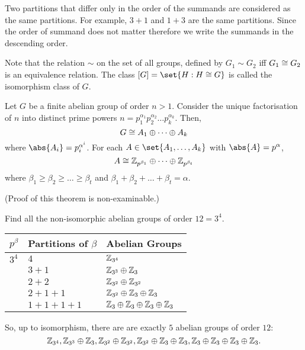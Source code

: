 \documentclass[11pt]{penrose}
\begin{document}
Two partitions that differ only in the order of the summands are considered as the same partitions. For example, $3+1$ and $1+3$ are the same partitions. Since the order of summand does not matter therefore we write the summands in the descending order.

Note that the relation $\sim$ on the set of all groups, defined by $G_{1} \sim G_{2}$ iff $G_{1} \mathrel{\cong} G_{2}$ is an equivalence relation. The class $[G] = \set{H : H \isom G}$ is called the isomorphism class of $G$.

\begin{nthm}
    Let $G$ be a finite abelian group of order $n > 1$. Consider the unique factorisation of $n$ into distinct prime powers $n = p_{1}^{\alpha_{1}} p_{2}^{\alpha_{2}} \dots p_{k}^{\alpha_{k}}$. Then,
    \begin{equation*}
        G \mathrel{\cong} A_{1} \oplus \dots \oplus A_{k}
    \end{equation*}
    where $\abs{A_{i}} = p_{i}^{\alpha^{i}}$. For each $A \in \set{A_{1}, \dots, A_{k}}$ with $\abs{A} = p^{\alpha}$,
    \begin{equation*}
        A \mathrel{\cong} \mathbb{Z}_{p^{\beta_{1}}} \oplus \dots \oplus \mathbb{Z}_{p^{\beta_{t}}}
    \end{equation*}
    where $\beta_{1} \geq \beta_{2} \geq \dots \geq \beta_{t}$ and $\beta_{1} + \beta_{2} + \dots + \beta_{t} = \alpha$.
\end{nthm}
(Proof of this theorem is non-examinable.)

\begin{negg}
    Find all the non-isomorphic abelian groups of order $12 = 3^{4}$.
    \begin{center}
        \begin{tabularx}{0.66\textwidth}{p{8mm}XX}
            \toprule
            $p^{\beta}$ & Partitions of $\beta$ & Abelian Groups\\
            \midrule
            $3^{4}$ & $4$ & $\mathbb{Z}_{3^{4}}$ \\
                    & $3+1$ & $\mathbb{Z}_{3^{3}} \oplus \mathbb{Z}_{3}$ \\
                    & $2+2$ & $\mathbb{Z}_{3^{2}} \oplus \mathbb{Z}_{3^{2}}$ \\
                    & $2+1+1$ & $\mathbb{Z}_{3^{2}} \oplus \mathbb{Z}_{3} \oplus \mathbb{Z}_{3}$ \\
                    & $1+1+1+1$ & $\mathbb{Z}_{3} \oplus \mathbb{Z}_{3} \oplus \mathbb{Z}_{3} \oplus \mathbb{Z}_{3}$ \\
            \bottomrule
        \end{tabularx}
    \end{center}
    So, up to isomorphism, there are are exactly $5$ abelian groups of order $12$:
    \begin{equation*}
        \mathbb{Z}_{3^{4}}, \mathbb{Z}_{3^{3}} \oplus \mathbb{Z}_{3}, \mathbb{Z}_{3^{2}} \oplus \mathbb{Z}_{3^{2}}, \mathbb{Z}_{3^{2}} \oplus \mathbb{Z}_{3} \oplus \mathbb{Z}_{3}, \mathbb{Z}_{3} \oplus \mathbb{Z}_{3} \oplus \mathbb{Z}_{3} \oplus \mathbb{Z}_{3}.
    \end{equation*}
\end{negg}
\end{document}
